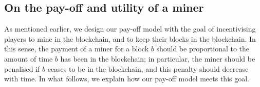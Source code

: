 \documentclass[a4paper,english,cleveref, autoref,numberwithinsect]{lipics-v2019}
\begin{document}
\subsection{On the pay-off and utility of a miner}
\label{sec-pay-uti}

As mentioned earlier, 
we design our pay-off model with the goal of incentivising players to mine in the blockchain, and to keep their blocks in the blockchain. In this sense, the payment of a miner for a block $b$ should be proportional to the amount of time $b$ has been in the blockchain; in particular, the miner should be penalised if $b$ ceases to be in the blockchain, and this penalty should decrease with time. In what follows, we explain how our pay-off model meets this goal. 
\end{document}
